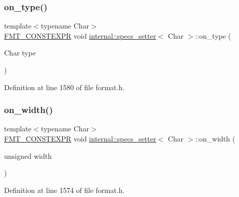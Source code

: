 \subsubsection{\texorpdfstring{on\+\_\+type()}{on\_type()}}
{\footnotesize\ttfamily template$<$typename Char$>$ \\
\hyperlink{core_8h_a69201cb276383873487bf68b4ef8b4cd}{F\+M\+T\+\_\+\+C\+O\+N\+S\+T\+E\+X\+PR} void \hyperlink{classinternal_1_1specs__setter}{internal\+::specs\+\_\+setter}$<$ Char $>$\+::on\+\_\+type (\begin{DoxyParamCaption}\item[{Char}]{type }\end{DoxyParamCaption})\hspace{0.3cm}{\ttfamily [inline]}}



Definition at line 1580 of file format.\+h.

\mbox{\label{classinternal_1_1specs__setter_afade8ebe9da33d1acbd67f733728c9b3}} 
\subsubsection{\texorpdfstring{on\+\_\+width()}{on\_width()}}
{\footnotesize\ttfamily template$<$typename Char$>$ \\
\hyperlink{core_8h_a69201cb276383873487bf68b4ef8b4cd}{F\+M\+T\+\_\+\+C\+O\+N\+S\+T\+E\+X\+PR} void \hyperlink{classinternal_1_1specs__setter}{internal\+::specs\+\_\+setter}$<$ Char $>$\+::on\+\_\+width (\begin{DoxyParamCaption}\item[{unsigned}]{width }\end{DoxyParamCaption})\hspace{0.3cm}{\ttfamily [inline]}}



Definition at line 1574 of file format.\+h.

\mbox{\label{classinternal_1_1specs__setter_a28b738cdad316052c678a94897019eb7}} 
